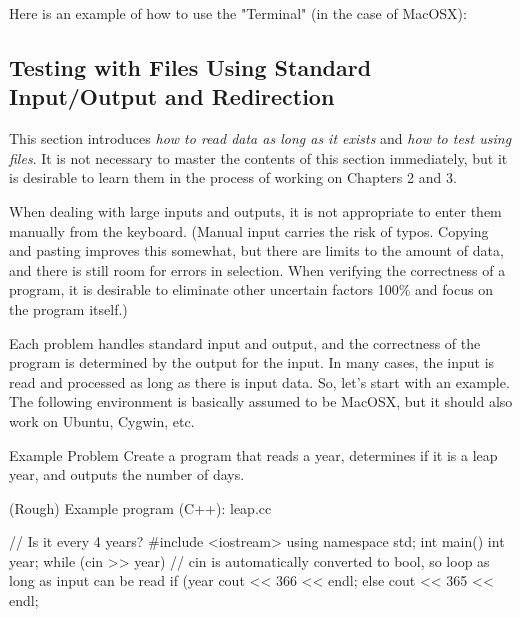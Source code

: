Here is an example of how to use the "Terminal" (in the case of MacOSX):

\subsection{Testing with Files Using Standard Input/Output and Redirection}

This section introduces \textit{how to read data as long as it exists} and \textit{how to test using files}.
It is not necessary to master the contents of this section immediately, but it is desirable to learn them in the process of working on Chapters 2 and 3.

When dealing with large inputs and outputs, it is not appropriate to enter them manually from the keyboard.
(Manual input carries the risk of typos. Copying and pasting improves this somewhat, but there are limits to the amount of data, and there is still room for errors in selection. When verifying the correctness of a program, it is desirable to eliminate other uncertain factors 100\% and focus on the program itself.)

Each problem handles standard input and output, and the correctness of the program is determined by the output for the input. In many cases, the input is read and processed as long as there is input data.
So, let's start with an example. The following environment is basically assumed to be MacOSX, but it should also work on Ubuntu, Cygwin, etc.

\begin{itembox}[l]{Example Problem}
Create a program that reads a year, determines if it is a leap year, and outputs the number of days.
\end{itembox}

(Rough) Example program (C++): leap.cc

\begin{cbox}
// Is it every 4 years?
#include <iostream>
using namespace std;
int main() {
    int year;
    while (cin >> year) { // cin is automatically converted to bool, so loop as long as input can be read
      if (year %
        cout << 366 << endl;
      else
        cout << 365 << endl;
    }
}
\end{cbox}

